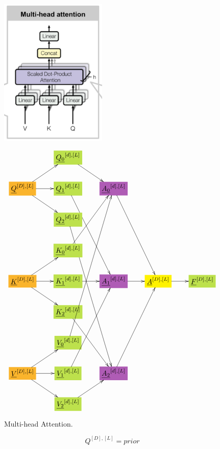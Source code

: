 \documentclass[12pt]{article}
\begin{document}
\begin{figure}[h!]\centering
\begin{minipage}{.5\linewidth}
\includegraphics[width=2in]{multi-head-att.jpg}
\end{minipage}%
\begin{minipage}{.5\linewidth}
$$\xymatrix{
&*+[F*:SpringGreen]{\underline{Q_0}^{[d],[L]}}\ar[dr]&&&
\\
*+[F*:Dandelion]{\underline{Q}^{[D], [L]}}\ar[ur]\ar[r]\ar[dr]&*+[F*:SpringGreen]{\underline{Q_1}^{[d],[L]}}\ar[dddr]&*+[F*:Orchid]{\underline{A_0}^{[d],[L]}}\ar[dddr]&&
\\
&*+[F*:SpringGreen]{\underline{Q_2}^{[d],[L]}}\ar[dddddr]&&&
\\
&*+[F*:SpringGreen]{\underline{K_0}^{[d],[L]}}\ar[uur]&&&
\\
*+[F*:Dandelion]{\underline{K}^{[D], [L]}}\ar[ur]\ar[r]\ar[dr]&*+[F*:SpringGreen]{\underline{K_1}^{[d],[L]}}\ar[r]&*+[F*:Orchid]{\underline{A_1}^{[d],[L]}}\ar[r]&*+[F*:yellow]{\underline{A}^{[D],[L]}}\ar[r]&*+[F*:SpringGreen]{\underline{F}^{[D],[L]}}
\\
&*+[F*:SpringGreen]{\underline{K_2}^{[d],[L]}}\ar[ddr]&&&
\\
&*+[F*:SpringGreen]{\underline{V_0}^{[d],[L]}}\ar[uuuuur]&&&
\\
*+[F*:Dandelion]{\underline{V}^{[D], [L]}}\ar[ur]\ar[r]\ar[dr]&*+[F*:SpringGreen]{\underline{V_1}^{[d],[L]}}\ar[uuur]&*+[F*:Orchid]{\underline{A_2}^{[d],[L]}}\ar[uuur]&&
\\
&*+[F*:SpringGreen]{\underline{V_2}^{[d],[L]}}\ar[ur]&&&
}$$
\end{minipage}
\caption{Multi-head Attention.}
\label{fig-texnn-for-multi-head-att}
\end{figure}\begin{subequations}
\begin{equation}
Q^{[D], [L]} = prior
\label{eq-Q-fun-multi-head-att}
\end{equation}


\end{subequations}
\end{document}
